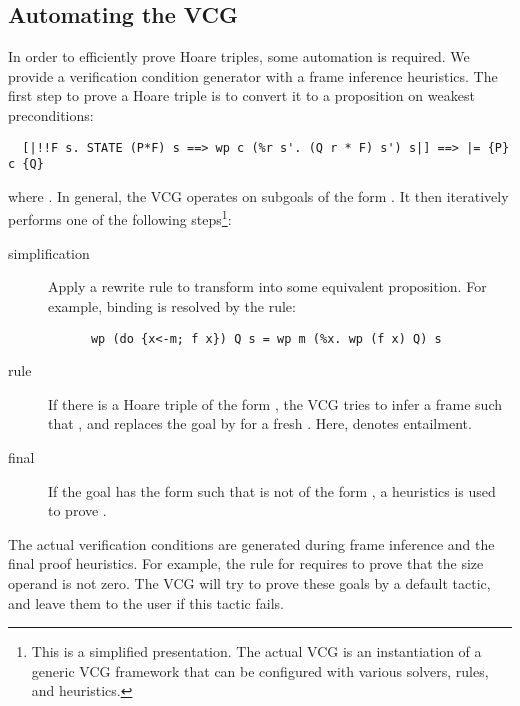 \documentclass[a4paper,oribibl,envcountsame]{llncs}
\begin{document}
\subsection{Automating the VCG}
In order to efficiently prove Hoare triples, some automation is required.
We provide a verification condition generator with a frame inference heuristics. 
The first step to prove a Hoare triple is to convert it to a proposition on weakest preconditions:
\begin{lstlisting}
  [|!!F s. STATE (P*F) s ==> wp c (%r s'. (Q r * F) s') s|] ==> |= {P} c {Q}
\end{lstlisting}
where .
In general, the VCG operates on subgoals of the form . 
It then iteratively performs one of the following steps\footnote{This is a simplified presentation. 
The actual VCG is an instantiation of a generic VCG framework that can be configured with various solvers, rules, and heuristics.}:
\begin{description}
  \item[simplification] Apply a rewrite rule to transform  into some equivalent proposition. For example,
    binding is resolved by the rule:
    \begin{lstlisting}
      wp (do {x<-m; f x}) Q s = wp m (%x. wp (f x) Q) s
    \end{lstlisting}
  \item[rule] If there is a Hoare triple of the form , the VCG tries to infer a frame  
  such that , and replaces the goal by  for a fresh . 
  Here,  denotes entailment.
  \item[final] If the goal has the form  such that  is not of the form , a heuristics is used to prove 
  .
\end{description}
The actual verification conditions are generated during frame inference and the final proof heuristics.
For example, the rule for  requires to prove that the size operand is not zero. 
The VCG will try to prove these goals by a default tactic, and leave them to the user if this tactic fails.
\end{document}
